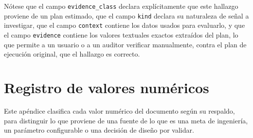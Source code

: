 \documentclass[11pt,a4paper]{report}
\begin{document}
N\'otese que el campo \texttt{evidence\_class} declara expl\'icitamente que este hallazgo proviene de un plan estimado, que el campo \texttt{kind} declara su naturaleza de se\~nal a investigar, que el campo \texttt{context} contiene los datos usados para evaluarlo, y que el campo \texttt{evidence} contiene los valores textuales exactos extra\'idos del plan, lo que permite a un usuario o a un auditor verificar manualmente, contra el plan de ejecuci\'on original, que el hallazgo es correcto.

\chapter{Registro de valores num\'ericos}
\label{ap:valores}

Este ap\'endice clasifica cada valor num\'erico del documento seg\'un su respaldo, para distinguir lo que proviene de una fuente de lo que es una meta de ingenier\'ia, un par\'ametro configurable o una decisi\'on de dise\~no por validar.
\end{document}
